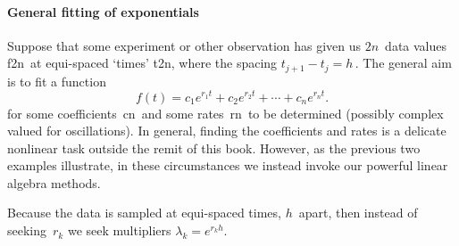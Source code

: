 \paragraph{General fitting of exponentials}
Suppose that some experiment or other observation has given us \(2n\)~data values \hlist f{2n}\ at equi-spaced `times' \hlist t{2n}, where the spacing \(t_{j+1}-t_j=h\)\,.
The general aim is to fit a function \cite[\S2.6, e.g.]{Cuyt2015}
\begin{equation}
f(t)=c_1e^{r_1t}+c_2e^{r_2t}+\cdots+c_ne^{r_nt}.
\label{eq:eiddse}
\end{equation}
for some coefficients~\hlist cn\ and some rates~\hlist rn\ to be determined (possibly complex valued for oscillations).
In general, finding the coefficients and rates is a delicate nonlinear task outside the remit of this book.
However, as the previous two examples illustrate, in these circumstances we instead invoke our powerful linear algebra methods.

Because the data is sampled at equi-spaced times, \(h\)~apart, then instead of seeking~\(r_k\) we seek multipliers \(\lambda_k=e^{r_kh}\).

